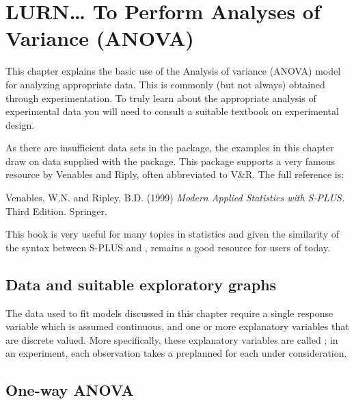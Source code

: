 

\chapter{LURN\ldots{} To Perform Analyses of Variance (ANOVA)} 
\label{ANOVA} 
 
 



 
This chapter explains the basic use of the Analysis of variance (ANOVA) model for analyzing appropriate data. This is commonly (but not always) obtained through experimentation. To truly learn about the appropriate analysis of experimental data you will need to consult a suitable textbook on experimental design. 
 
As there are insufficient data sets in the  package, the examples in this chapter draw on data supplied with the  package. This package supports a very famous resource by Venables and Riply, often abbreviated to V\&R. The full reference is: 
 
Venables, W.N. and Ripley, B.D. (1999) {\it Modern Applied Statistics with S-PLUS.} Third Edition. Springer.  
 
This book is very useful for many topics in statistics and given the similarity of the syntax between S-PLUS and \R{}, remains a good resource for users of \R{} today. 
 
 
 
\section{Data and suitable exploratory graphs} 
 
The data used to fit models discussed in this chapter require a single response variable which is assumed continuous, and one or more explanatory variables that are discrete valued. More specifically, these explanatory variables are called ; in an experiment, each observation takes a preplanned  for each  under consideration. 
 
\section{One-way ANOVA} 
 
